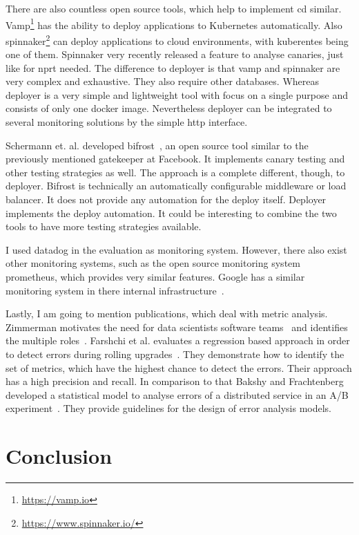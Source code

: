 There are also countless open source tools, which help to implement \gls{cd}
similar. Vamp\footnote{\url{https://vamp.io}} has the ability to deploy applications to
Kubernetes automatically. Also spinnaker\footnote{\url{https://www.spinnaker.io/}} can
deploy applications to cloud environments, with kuberentes being one of them. Spinnaker
very recently released a feature to analyse canaries, just like for \gls{nprt} needed. The
difference to deployer is that vamp and spinnaker are very complex and exhaustive. They
also require other databases. Whereas deployer is a very simple and lightweight tool with
focus on a single purpose and consists of only one docker image. Nevertheless deployer can
be integrated to several monitoring solutions by the simple http interface.

Schermann et. al. developed bifrost~\cite{bifrost}, an open source tool similar to the
previously mentioned gatekeeper at Facebook. It implements canary testing and other
testing strategies as well. The approach is a complete different, though, to
deployer. Bifrost is technically an automatically configurable middleware or
load balancer. It does not provide any automation for the deploy itself. Deployer
implements the deploy automation. It could be interesting to combine the two tools to have
more testing strategies available.

I used datadog in the evaluation as monitoring system. However, there also exist other
monitoring systems, such as the open source monitoring system prometheus, which provides
very similar features. Google has a similar monitoring system in there internal
infrastructure~\cite{sre_monitoring}.

Lastly, I am going to mention publications, which deal with metric analysis. Zimmerman
motivates the need for data scientists software teams~\cite{data_science_role2} and
identifies the multiple roles~\cite{data_science_role}. Farshchi et al. evaluates a
regression based approach in order to detect errors during rolling
upgrades~\cite{anomaly_detection}. They demonstrate how to identify the set of metrics,
which have the highest chance to detect the errors. Their approach has a high precision
and recall. In comparison to that Bakshy and Frachtenberg developed a statistical model to
analyse errors of a distributed service in an A/B
experiment~\cite{error_analysis_of_distr_system}. They provide guidelines for the design
of error analysis models.

\chapter{Conclusion}
\label{chap:conclusion}


